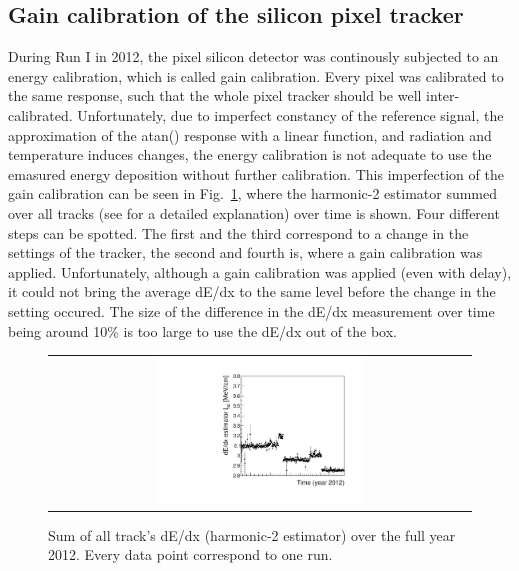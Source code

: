 
\subsection{Gain calibration of the silicon pixel tracker}

During Run I in 2012, the pixel silicon detector was continously subjected to an energy calibration, which is called gain calibration.
Every pixel was calibrated to the same response, such that the whole pixel tracker should be well inter-calibrated.
Unfortunately, due to imperfect constancy of the reference signal, the approximation of the atan() response with a linear function, and radiation and temperature induces changes, the energy calibration is not adequate to use the emasured energy deposition without further calibration.
This imperfection of the gain calibration can be seen in Fig.~\ref{fig:dEdx_beforeCalibration}, where the harmonic-2 estimator summed over all tracks  (see \cite{} for a detailed explanation) over time is shown.
Four different steps can be spotted. The first and the third correspond to a change  in the settings of the tracker, the second and fourth is, where a gain calibration was applied.
Unfortunately, although a gain calibration was applied (even with delay), it could not bring the average dE/dx to the same level before the change in the setting occured.
The size of the difference in the dE/dx measurement over time being around 10\% is too large to use the dE/dx out of the box.

\begin{figure}[!bt]
  \centering 
  \begin{tabular}{c}
  \includegraphics[width=0.5\textwidth]{figures/analysis/StabilityPlot_Pixel_beforeCalibration_withoutStepFits_NEW.pdf}
  \end{tabular}
  \caption{Sum of all track's dE/dx (harmonic-2 estimator) over the full year 2012. Every data point correspond to one run.} 
  \label{fig:dEdx_beforeCalibration}
\end{figure}

